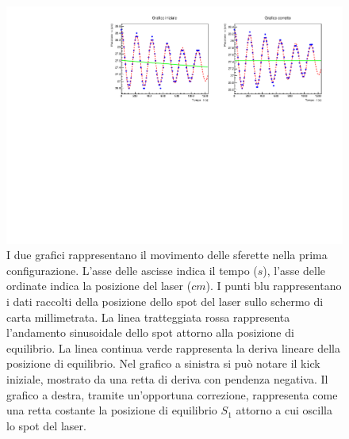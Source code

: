 \documentclass{article}
\begin{document}
\begin{figure}[ht!]
    \centering
    \includegraphics[width=1\linewidth]{images/graphS1.pdf}
    \caption{I due grafici rappresentano il movimento delle sferette nella prima configurazione. L'asse delle ascisse indica il tempo ($s$), l'asse delle ordinate indica la posizione del laser ($cm$). I punti blu rappresentano i dati raccolti della posizione dello spot del laser sullo schermo di carta millimetrata. La linea tratteggiata rossa rappresenta l'andamento sinusoidale dello spot attorno alla posizione di equilibrio. La linea continua verde rappresenta la deriva lineare della posizione di equilibrio. Nel grafico a sinistra si può notare il kick iniziale, mostrato da una retta di deriva con pendenza negativa. Il grafico a destra, tramite un'opportuna correzione, rappresenta come una retta costante la posizione di equilibrio $S_1$ attorno a cui oscilla lo spot del laser.}
    \label{fig:graph_1}
\end{figure}

\newpage
\end{document}
